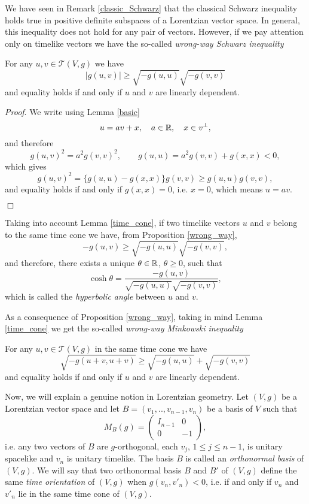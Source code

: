 We have seen in Remark \ref{classic_Schwarz} that the classical Schwarz inequality
holds true in positive definite subspaces of a Lorentzian vector space. In general,
this inequality does not hold for any pair of vectors. However, if we pay attention
only on timelike vectors we have the so-called \emph{wrong-way Schwarz inequality}
\cite[Prop. 5.30]{oneill83}

\begin{pro}\label{wrong_way} For any $u,v \in \mathcal{T}(V,g)$ we have
\[
\mid g(u,v) \mid \geq \sqrt{-g(u,u)}\sqrt{-g(v,v)}
\]
and equality holds if and only if $u$ and $v$ are linearly dependent.
\end{pro}
\noindent \emph{Proof}. We write using Lemma \ref{basic}
\[
u=av+x, \quad a\in \mathbb{R}, \quad x\in v^{\perp},
\]
and therefore
\[
g(u,v)^2=a^2g(v,v)^2, \quad \quad g(u,u)=a^2g(v,v)+g(x,x)<0,
\]
which gives
\[
g(u,v)^2=\{g(u,u)-g(x,x)\}g(v,v) \geq g(u,u)g(v,v),
\]
and equality holds if and only if $g(x,x)=0$, i.e. $x=0$,
which means $u=av$.

\hfill{$\Box$}

\vspace{2mm}

Taking into account Lemma \ref{time_cone}, if two timelike vectors $u$ and $v$
belong to the same time cone we have, from Proposition \ref{wrong_way},
\[
-g(u,v) \geq \sqrt{-g(u,u)}\sqrt{-g(v,v)},
\]
and therefore, there exists a unique $\theta \in \mathbb{R}$, $\theta \geq 0$, such that
\[
\cosh \theta =\frac{-g(u,v)}{\sqrt{-g(u,u)}\sqrt{-g(v,v)}},
\]
which is called the \emph{hyperbolic angle} between $u$ and $v$.

\vspace{2mm}

As a consequence of Proposition \ref{wrong_way}, taking in mind Lemma \ref{time_cone}
we get the so-called \emph{wrong-way Minkowski inequality} \cite[Cor. 5.31]{oneill83}

\begin{cor}\label{Minkowski}
For any $u,v \in \mathcal{T}(V,g)$ in the same time cone we have
\[
\sqrt{-g(u+v,u+v)} \geq \sqrt{-g(u,u)}+\sqrt{-g(v,v)}
\]
and equality holds if and only if $u$ and $v$ are linearly dependent.
\end{cor}


Now, we will explain a genuine notion in Lorentzian geometry. Let $(V,g)$ be a Lorentzian
vector space and let $B=(v_1,..,v_{n-1},v_n)$ be a basis of $V$ such that
\[
M_B(g) = \left( \begin{array}{cc}
I_{n-1} & 0  \\
0 & -1
\end{array} \right),
\]
i.e. any two vectors of $B$ are $g$-orthogonal, each $v_j$, $1\leq j \leq n-1$, is unitary spacelike and
$v_n$ is unitary timelike. The basis $B$ is called an \emph{orthonormal basis} of $(V,g)$. We will say
that two orthonormal basis $B$ and $B'$ of $(V,g)$ define the same \emph{time orientation} of $(V,g)$
when $g(v_n,v'_n)<0$, i.e. if and only if $v_n$ and $v'_n$ lie in the same time cone of $(V,g)$.

